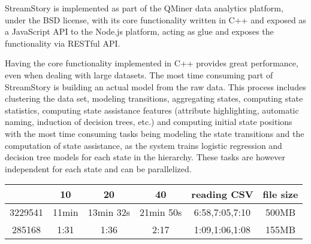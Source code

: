StreamStory is implemented as part of the QMiner \cite{qminer} data analytics platform,
under the BSD license, with its core functionality written in C++ and exposed as a 
JavaScript API to the Node.js platform, acting as glue and exposes the functionality
via RESTful API.

Having the core functionality implemented in C++ provides great performance, even when
dealing with large datasets. The most time consuming part of StreamStory is building
an actual model from the raw data. This process includes clustering the data set,
modeling transitions, aggregating states, computing state statistics, computing state assistance
features (attribute highlighting, automatic naming, induction of decision trees, etc.) and
computing initial state positions with the most time consuming tasks being modeling the state
transitions and the computation of state assistance, as the system trains logistic regression
and decision tree models for each state in the hierarchy. These tasks are however independent
for each state and can be parallelized.

\begin{tabular}{ c | c c c c c}
	\label{tab:time-tests}
	 & 10 & 20 & 40 & reading CSV & file size \\
	\hline
	3229541 & 11min & 13min 32s & 21min 50s & 6:58,7:05,7:10 & 500MB \\
	285168 & 1:31 & 1:36 & 2:17 & 1:09,1:06,1:08 & 155MB
\end{tabular}
